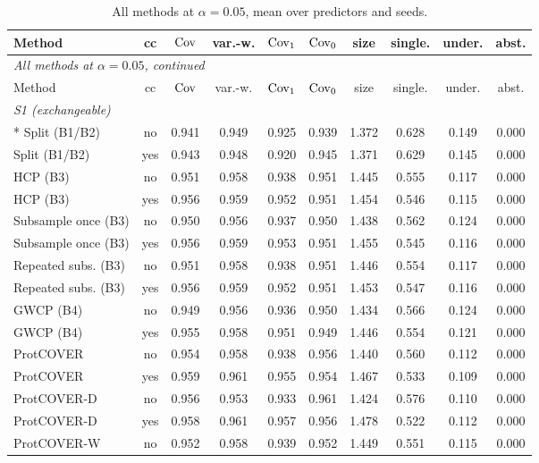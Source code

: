 \begin{longtable}{lccccccccc}
\caption{All methods at $\alpha=0.05$, mean over predictors and seeds.}\label{tab:full05}\\
\toprule
Method & cc & $\mathrm{Cov}$ & var.-w. & $\mathrm{Cov}_1$ & $\mathrm{Cov}_0$ & size & single. & under. & abst. \\
\midrule
\endfirsthead
\multicolumn{10}{l}{\emph{All methods at $\alpha=0.05$, continued}}\\
\toprule
Method & cc & $\mathrm{Cov}$ & var.-w. & $\mathrm{Cov}_1$ & $\mathrm{Cov}_0$ & size & single. & under. & abst. \\
\midrule
\endhead
\multicolumn{10}{l}{\emph{S1 (exchangeable)}}\\*
Split (B1/B2) & no & 0.941 & 0.949 & 0.925 & 0.939 & 1.372 & 0.628 & 0.149 & 0.000 \\
Split (B1/B2) & yes & 0.943 & 0.948 & 0.920 & 0.945 & 1.371 & 0.629 & 0.145 & 0.000 \\
HCP (B3) & no & 0.951 & 0.958 & 0.938 & 0.951 & 1.445 & 0.555 & 0.117 & 0.000 \\
HCP (B3) & yes & 0.956 & 0.959 & 0.952 & 0.951 & 1.454 & 0.546 & 0.115 & 0.000 \\
Subsample once (B3) & no & 0.950 & 0.956 & 0.937 & 0.950 & 1.438 & 0.562 & 0.124 & 0.000 \\
Subsample once (B3) & yes & 0.956 & 0.959 & 0.953 & 0.951 & 1.455 & 0.545 & 0.116 & 0.000 \\
Repeated subs. (B3) & no & 0.951 & 0.958 & 0.938 & 0.951 & 1.446 & 0.554 & 0.117 & 0.000 \\
Repeated subs. (B3) & yes & 0.956 & 0.959 & 0.952 & 0.951 & 1.453 & 0.547 & 0.116 & 0.000 \\
GWCP (B4) & no & 0.949 & 0.956 & 0.936 & 0.950 & 1.434 & 0.566 & 0.124 & 0.000 \\
GWCP (B4) & yes & 0.955 & 0.958 & 0.951 & 0.949 & 1.446 & 0.554 & 0.121 & 0.000 \\
ProtCOVER & no & 0.954 & 0.958 & 0.938 & 0.956 & 1.440 & 0.560 & 0.112 & 0.000 \\
ProtCOVER & yes & 0.959 & 0.961 & 0.955 & 0.954 & 1.467 & 0.533 & 0.109 & 0.000 \\
ProtCOVER-D & no & 0.956 & 0.953 & 0.933 & 0.961 & 1.424 & 0.576 & 0.110 & 0.000 \\
ProtCOVER-D & yes & 0.958 & 0.961 & 0.957 & 0.956 & 1.478 & 0.522 & 0.112 & 0.000 \\
ProtCOVER-W & no & 0.952 & 0.958 & 0.939 & 0.952 & 1.449 & 0.551 & 0.115 & 0.000 \\

\end{longtable}
